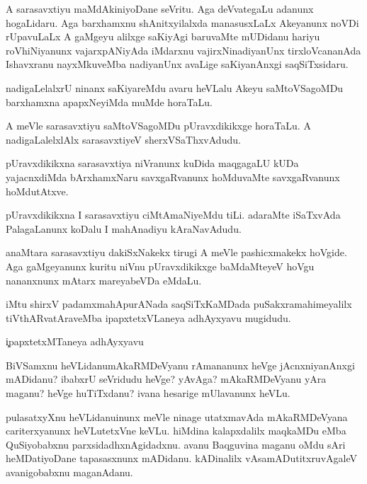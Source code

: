\begin{mng}
A sarasavxtiyu maMdAkiniyoDane seVritu. Aga deVvategaLu adanunx hogaLidaru. Aga barxhamxnu shAnitxyilalxda manasusxLaLx Akeyanunx noVDi rUpavuLaLx A gaMgeyu alilxge saKiyAgi baruvaMte mUDidanu hariyu roVhiNiyanunx vajarxpANiyAda iMdarxnu vajirxNinadiyanUnx tirxloVcananAda Ishavxranu nayxMkuveMba nadiyanUnx avaLige saKiyanAnxgi saqSiTxsidaru.
\end{mng}

\begin{mng}
nadigaLelalxrU ninanx saKiyareMdu avaru heVLalu Akeyu saMtoVSagoMDu barxhamxna apapxNeyiMda muMde horaTaLu.
\end{mng}

\begin{mng}
A meVle sarasavxtiyu saMtoVSagoMDu pUravxdikikxge horaTaLu. A nadigaLalelxlAlx sarasavxtiyeV sherxVSaThxvAdudu.
\end{mng}

\begin{mng}
pUravxdikikxna sarasavxtiya niVranunx kuDida maqgagaLU kUDa yajacnxdiMda bArxhamxNaru savxgaRvanunx hoMduvaMte savxgaRvanunx hoMdutAtxve.
\end{mng}

\begin{mng}
pUravxdikikxna I sarasavxtiyu ciMtAmaNiyeMdu tiLi. adaraMte iSaTxvAda PalagaLanunx koDalu I mahAnadiyu kAraNavAdudu.
\end{mng}

\begin{mng}
anaMtara sarasavxtiyu dakiSxNakekx tirugi A meVle pashicxmakekx hoVgide. Aga gaMgeyanunx kuritu niVnu pUravxdikikxge baMdaMteyeV hoVgu nananxnunx mAtarx mareyabeVDa eMdaLu.
\end{mng}
iMtu shirxV padamxmahApurANada saqSiTxKaMDada puSakxramahimeyalilx tiVthARvatAraveMba ipapxtetxVLaneya adhAyxyavu mugidudu.

\begin{mng}
\c{ipapxtetxMTaneya adhAyxyavu}
\end{mng}

\begin{mng}
BiVSamxnu heVLidanu\mdash mAkaRMDeVyanu rAmananunx heVge jAcnxniyanAnxgi mADidanu? ibabxrU seVridudu heVge? yAvAga? mAkaRMDeVyanu yAra maganu? heVge huTiTxdanu? ivana hesarige mUlavanunx heVLu.
\end{mng}

\begin{mng}
pulasatxyXnu heVLidanu\mdash inunx meVle ninage utatxmavAda mAkaRMDeVyana cariterxyanunx heVLutetxVne keVLu. hiMdina kalapxdalilx maqkaMDu eMba QuSiyobabxnu parxsidadhxnAgidadxnu. avanu Baqguvina maganu oMdu sAri heMDatiyoDane tapasasxnunx mADidanu. kADinalilx vAsamADutitxruvAgaleV avanigobabxnu maganAdanu.
\end{mng}

